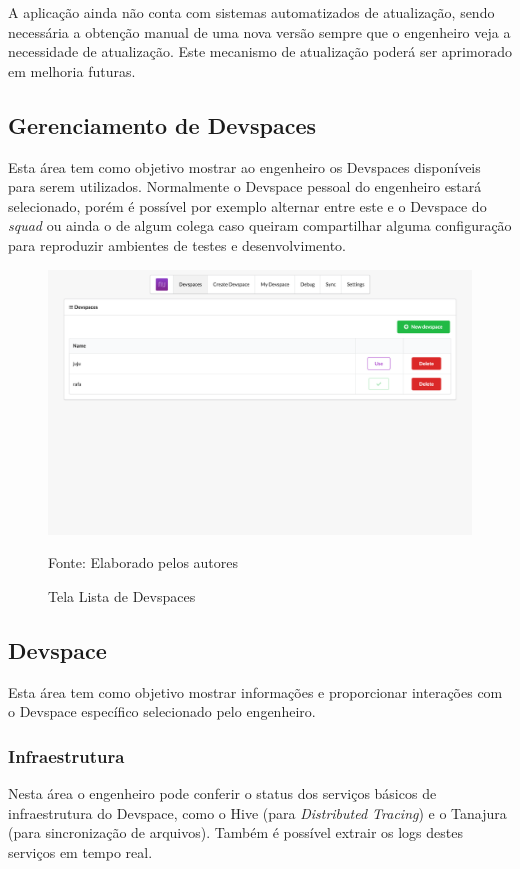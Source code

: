 \documentclass[twosideprint]{politex}
\newcommand{\legend}[1]{\begin{center}\def\caption{}\caption{#1}\end{center}}
\begin{document}
A aplicação ainda não conta com sistemas automatizados de atualização, sendo necessária a obtenção manual de uma nova versão sempre que o engenheiro veja a necessidade de atualização. Este mecanismo de atualização poderá ser aprimorado em melhoria futuras.

\subsection{Gerenciamento de Devspaces}
Esta área tem como objetivo mostrar ao engenheiro os Devspaces disponíveis para serem utilizados. Normalmente o Devspace pessoal do engenheiro estará selecionado, porém é possível por exemplo alternar entre este e o Devspace do \textit{squad} ou ainda o de algum colega caso queiram compartilhar alguma configuração para reproduzir ambientes de testes e desenvolvimento.

\begin{figure}[htb]
	\caption{\label{fig_frontend_devspaces}Tela Lista de Devspaces}
	\begin{center}
	\includegraphics[width=\textwidth,keepaspectratio]{pictures/frontend/frontend-devspaces.png}
	\end{center}
	\legend{Fonte: Elaborado pelos autores}
\end{figure}



\subsection{Devspace}
Esta área tem como objetivo mostrar informações e proporcionar interações com o Devspace específico selecionado pelo engenheiro.

\subsubsection{Infraestrutura}
Nesta área o engenheiro pode conferir o status dos serviços básicos de infraestrutura do Devspace, como o Hive (para \textit{Distributed Tracing}) e o Tanajura (para sincronização de arquivos). Também é possível extrair os logs destes serviços em tempo real.
\end{document}
